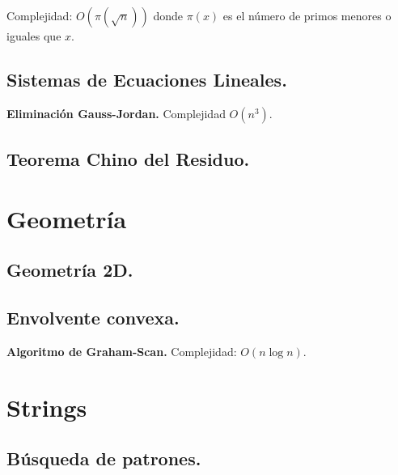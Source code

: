 \documentclass[10pt, letterpaper, twoside]{article}
\begin{document}
Complejidad: $O\left(\pi\left(\sqrt{n}\right)\right)$ donde $\pi(x)$ es el número de primos menores o iguales que $x$.



\subsection{Sistemas de Ecuaciones Lineales.}

\textbf{Eliminación Gauss-Jordan.} Complejidad $O(n^3)$.



\subsection{Teorema Chino del Residuo.}




\section{Geometría}

\subsection{Geometría 2D.}



\subsection{Envolvente convexa.}

\textbf{Algoritmo de Graham-Scan.} Complejidad: $O(n \log n)$.




\section{Strings}

\subsection{Búsqueda de patrones.}
\end{document}
